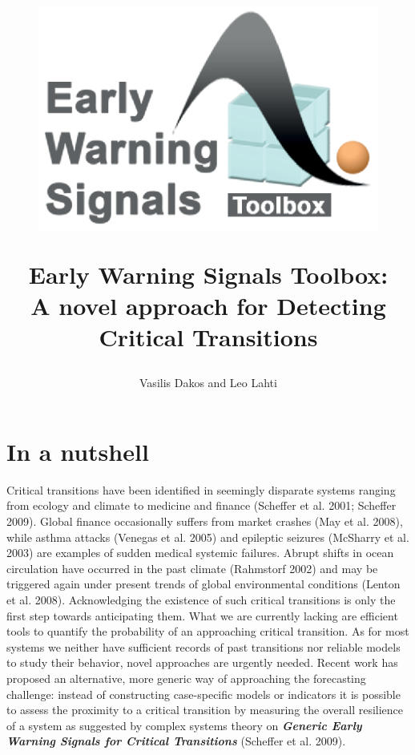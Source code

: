 \documentclass[12pt,a4paper,final]{article}
\author{Vasilis Dakos and Leo Lahti}
\title{
\begin{figure}[h]
\includegraphics[scale=0.55]{logoEWS.eps}
\end{figure}
Early Warning Signals Toolbox:\\ 
A novel approach for Detecting Critical Transitions
}
\begin{document}
\maketitle

\section{In a nutshell} %

Critical transitions have been identified in seemingly disparate systems ranging from ecology and climate to medicine and finance (Scheffer et al. 2001; Scheffer 2009). Global finance occasionally suffers from market crashes (May et al. 2008), while asthma attacks (Venegas et al. 2005) and epileptic seizures (McSharry et al. 2003) are examples of sudden medical systemic failures. Abrupt shifts in ocean circulation have occurred in the past climate (Rahmstorf 2002) and may be triggered again under present trends of global environmental conditions (Lenton et al. 2008).
Acknowledging the existence of such critical transitions is only the first step towards anticipating them. What we are currently lacking are efficient tools to quantify the probability of an approaching critical transition. As for most systems we neither have sufficient records of past transitions nor reliable models to study their behavior, novel approaches are urgently needed. Recent work has proposed an alternative, more generic way of approaching the forecasting challenge: instead of constructing case-specific models or indicators it is possible to assess the proximity to a critical transition by measuring the overall resilience of a system as suggested by complex systems theory on \textit{\textbf{Generic Early Warning Signals for Critical Transitions}} (Scheffer et al. 2009).\\
\\
\\
\end{document}
